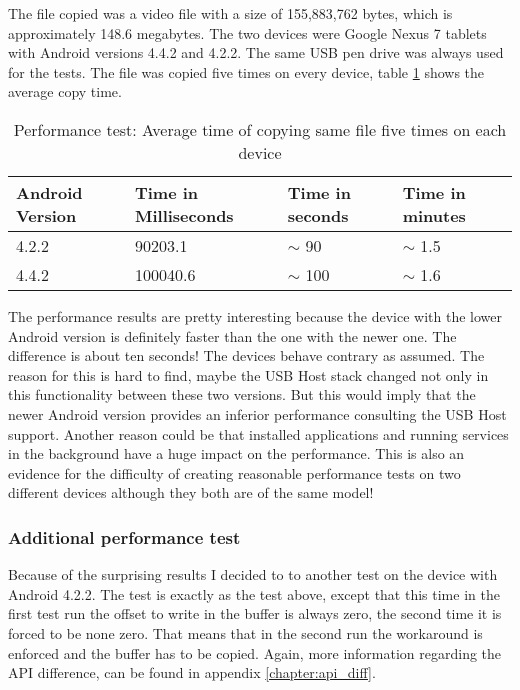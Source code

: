 The file copied was a video file with a size of 155,883,762 bytes, which is approximately 148.6 megabytes. The two devices were Google Nexus 7 tablets with Android versions 4.4.2 and 4.2.2. The same USB pen drive was always used for the tests. The file was copied five times on every device, table \ref{table:performance_test} shows the average copy time.

\begin{table}[ht]
\caption{Performance test: Average time of copying same file five times on each device}
\centering
\begin{tabular}{|l|l|l|l|}
\hline\hline
\textbf{Android Version} & \textbf{Time in Milliseconds} & \textbf{Time in seconds} & \textbf{Time in minutes} \\ \hline
4.2.2 & 90203.1 & $\sim$ 90 & $\sim$ 1.5 \\ \hline
4.4.2 & 100040.6 & $\sim$ 100 & $\sim$ 1.6 \\ \hline
\end{tabular}
\label{table:performance_test}
\end{table}

The performance results are pretty interesting because the device with the lower Android version is definitely faster than the one with the newer one. The difference is about ten seconds! The devices behave contrary as assumed. The reason for this is hard to find, maybe the USB Host stack changed not only in this functionality between these two versions. But this would imply that the newer Android version provides an inferior performance consulting the USB Host support. Another reason could be that installed applications and running services in the background have a huge impact on the performance. This is also an evidence for the difficulty of creating reasonable performance tests on two different devices although they both are of the same model!

\subsubsection{Additional performance test}

Because of the surprising results I decided to to another test on the device with Android 4.2.2. The test is exactly as the test above, except that this time in the first test run the offset to write in the buffer is always zero, the second time it is forced to be none zero. That means that in the second run the workaround is enforced and the buffer has to be copied. Again, more information regarding the API difference, can be found in appendix \ref{chapter:api_diff}.

